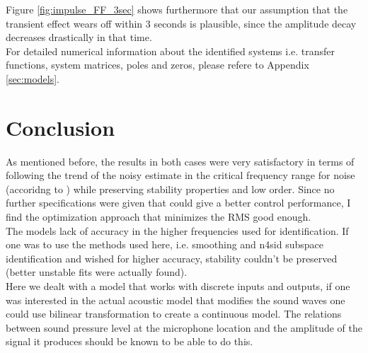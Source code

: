 Figure \ref{fig:impulse_FF_3sec} shows furthermore that our assumption that the transient effect wears off within 3 seconds is plausible, since the amplitude decay decreases drastically in that time.\\

For detailed numerical information about the identified systems i.e. transfer functions, system matrices, poles and zeros, please refere to Appendix \ref{sec:models}.\\

\chapter{Conclusion}\label{chap:conclusion}

As mentioned before, the results in both cases were very satisfactory in terms of following the trend of the noisy estimate in the critical frequency range for noise (accoridng to \cite{castae2010active}) while preserving stability properties and low order. Since no further specifications were given that could give a better control performance, I find the optimization approach that minimizes the RMS good enough.\\

The models lack of accuracy in the higher frequencies used for identification. If one was to use the methods used here, i.e. smoothing and n4sid subspace identification and wished for higher accuracy, stability couldn't be preserved (better unstable fits were actually found).\\

Here we dealt with a model that works with discrete inputs and outputs, if one was interested in the actual acoustic model that modifies the sound waves one could use bilinear transformation to create a continuous model. The relations between sound pressure level at the microphone location and the amplitude of the signal it produces should be known to be able to do this.


